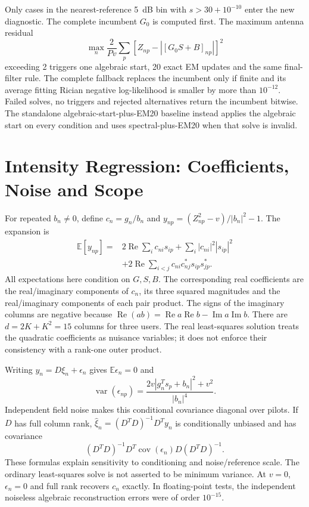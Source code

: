 Only cases in the nearest-reference 5~dB bin with $s>30+10^{-10}$ enter the new diagnostic. The complete incumbent $G_0$ is computed first. The maximum antenna residual
\begin{equation}
 \max_n\frac{2}{Pv}\sum_p[Z_{np}-|[G_0S+B]_{np}|]^2
\end{equation}
exceeding 2 triggers one algebraic start, 20 exact EM updates and the same final-filter rule. The complete fallback replaces the incumbent only if finite and its average fitting Rician negative log-likelihood is smaller by more than $10^{-12}$. Failed solves, no triggers and rejected alternatives return the incumbent bitwise. The standalone algebraic-start-plus-EM20 baseline instead applies the algebraic start on every condition and uses spectral-plus-EM20 when that solve is invalid.

\section{Intensity Regression: Coefficients, Noise and Scope}
For repeated $b_n\ne0$, define $c_n=g_n/b_n$ and $y_{np}=(Z_{np}^2-v)/|b_n|^2-1$. The expansion is
\begin{align}
 \mathbb E[y_{np}]={}&2\operatorname{Re}\sum_i c_{ni}s_{ip}
 +\sum_i|c_{ni}|^2|s_{ip}|^2\nonumber\\
 &+2\operatorname{Re}\sum_{i<j}c_{ni}c_{nj}^*s_{ip}s_{jp}^*.
\end{align}
All expectations here condition on $G,S,B$. The corresponding real coefficients are the real/imaginary components of $c_n$, its three squared magnitudes and the real/imaginary components of each pair product. The signs of the imaginary columns are negative because $\operatorname{Re}(ab)=\operatorname{Re}a\operatorname{Re}b-\operatorname{Im}a\operatorname{Im}b$. There are $d=2K+K^2=15$ columns for three users. The real least-squares solution treats the quadratic coefficients as nuisance variables; it does not enforce their consistency with a rank-one outer product.

Writing $y_n=D\xi_n+\epsilon_n$ gives $\mathbb E\epsilon_n=0$ and
\begin{equation}
 \operatorname{var}(\epsilon_{np})=
 \frac{2v|g_n^Ts_p+b_n|^2+v^2}{|b_n|^4}.
\end{equation}
Independent field noise makes this conditional covariance diagonal over pilots. If $D$ has full column rank, $\widehat\xi_n=(D^TD)^{-1}D^Ty_n$ is conditionally unbiased and has covariance
\begin{equation}
 (D^TD)^{-1}D^T\operatorname{cov}(\epsilon_n)D(D^TD)^{-1}.
\end{equation}
These formulas explain sensitivity to conditioning and noise/reference scale. The ordinary least-squares solve is not asserted to be minimum variance. At $v=0$, $\epsilon_n=0$ and full rank recovers $c_n$ exactly. In floating-point tests, the independent noiseless algebraic reconstruction errors were of order $10^{-15}$.

